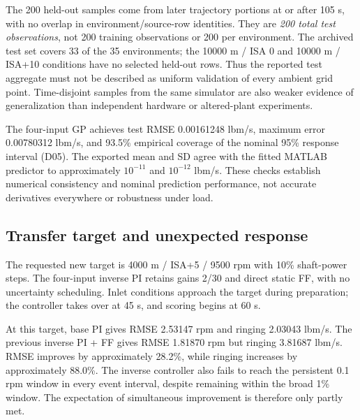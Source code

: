The 200 held-out samples come from later trajectory portions at or after 105 s, with no overlap in environment/source-row identities. They are \emph{200 total test observations}, not 200 training observations or 200 per environment. The archived test set covers 33 of the 35 environments; the 10000 m / ISA 0 and 10000 m / ISA+10 conditions have no selected held-out rows. Thus the reported test aggregate must not be described as uniform validation of every ambient grid point. Time-disjoint samples from the same simulator are also weaker evidence of generalization than independent hardware or altered-plant experiments.


The four-input GP achieves test RMSE 0.00161248 lbm/s, maximum error 0.00780312 lbm/s, and 93.5\% empirical coverage of the nominal 95\% response interval (D05). The exported mean and SD agree with the fitted MATLAB predictor to approximately $10^{-11}$ and $10^{-12}$ lbm/s. These checks establish numerical consistency and nominal prediction performance, not accurate derivatives everywhere or robustness under load.

\subsection{Transfer target and unexpected response}
The requested new target is 4000 m / ISA+5 / 9500 rpm with 10\% shaft-power steps. The four-input inverse PI retains gains 2/30 and direct static FF, with no uncertainty scheduling. Inlet conditions approach the target during preparation; the controller takes over at 45 s, and scoring begins at 60 s.

At this target, base PI gives RMSE 2.53147 rpm and ringing 2.03043 lbm/s. The previous inverse PI + FF gives RMSE 1.81870 rpm but ringing 3.81687 lbm/s. RMSE improves by approximately 28.2\%, while ringing increases by approximately 88.0\%. The inverse controller also fails to reach the persistent 0.1 rpm window in every event interval, despite remaining within the broad 1\% window. The expectation of simultaneous improvement is therefore only partly met.


